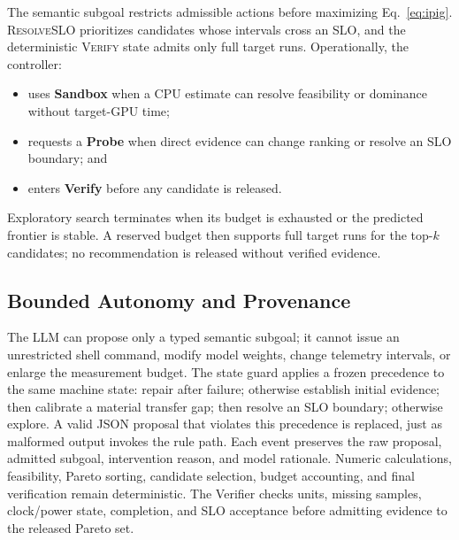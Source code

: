 The semantic subgoal restricts admissible actions before maximizing
Eq.~\ref{eq:ipig}.  \textsc{ResolveSLO} prioritizes candidates whose intervals
cross an SLO, and the deterministic \textsc{Verify} state admits only full
target runs.  Operationally, the controller:
\begin{itemize}
    \item uses \textbf{Sandbox} when a CPU estimate can resolve feasibility or
    dominance without target-GPU time;
    \item requests a \textbf{Probe} when direct evidence can change ranking or
    resolve an SLO boundary; and
    \item enters \textbf{Verify} before any candidate is released.
\end{itemize}
Exploratory search terminates when its budget is exhausted or the predicted
frontier is stable.  A reserved budget then supports full target runs for the
top-$k$ candidates; no recommendation is released without verified evidence.

\subsection{Bounded Autonomy and Provenance}

The LLM can propose only a typed semantic subgoal; it cannot issue an
unrestricted shell command, modify model weights, change telemetry intervals,
or enlarge the measurement budget.  The state guard applies a frozen precedence
to the same machine state: repair after failure; otherwise establish initial
evidence; then calibrate a material transfer gap; then resolve an SLO boundary;
otherwise explore.  A valid JSON proposal that violates this precedence is
replaced, just as malformed output invokes the rule path.  Each event preserves
the raw proposal, admitted subgoal, intervention reason, and model rationale.
Numeric calculations, feasibility, Pareto sorting, candidate selection, budget
accounting, and final verification remain deterministic.  The Verifier checks
units, missing samples, clock/power state, completion, and SLO acceptance before
admitting evidence to the released Pareto set.
